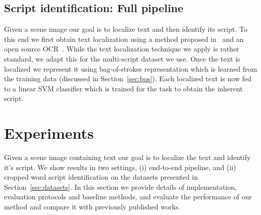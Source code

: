 \subsection{Script identification: Full pipeline}
Given a scene image our goal is to localize text and then identify its script.
To this end we first obtain text localization using a method proposed in~\cite{GomezK14}
and an open source OCR~\cite{tessOCR}. While the text localization technique we apply is rather standard, we adapt this for the multi-script dataset we use. 
Once the text is localized we represent it using bag-of-strokes representation which is learned from the training data (discussed in Section~\ref{sec:bos}). Each localized
text is now fed to a linear SVM classifier which is trained for the task to obtain the inherent script.

\section{Experiments}
\label{sec:expts}
Given a scene image containing text our goal is to localize the text and identify it's script. We show results in two settings, (i) end-to-end pipeline, and (ii) cropped word script identification on the datasets presented in Section~\ref{sec:datasets}.
In this section we provide details of implementation, evaluation protocols and baseline methods, and evaluate the performance of our method and compare it with previously published works.


